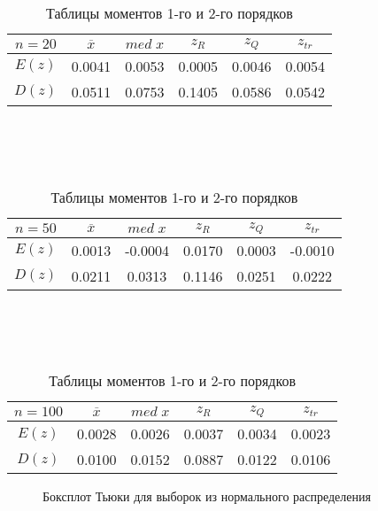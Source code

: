 \documentclass[12pt]{article}
\begin{document}
\begin{table}[h!]
	\begin{tabular}{ | c | c | c | c | c | c |}
	\hline
	$n = 20$ & $\overline{x}$ & $med\;x$ & $z_R$ & $z_Q$ & $z_{tr}$ \\ \hline
	$E(z)$ & 0.0041 & 0.0053 & 0.0005 & 0.0046 & 0.0054 \\ \hline
	$D(z)$ & 0.0511 & 0.0753 & 0.1405 & 0.0586 & 0.0542 \\ \hline
	\end{tabular}
	\\
	\\ \\
	\begin{tabular}{ | c | c | c | c | c | c |}
	\hline
	$n = 50$ & $\overline{x}$ & $med\;x$ & $z_R$ & $z_Q$ & $z_{tr}$ \\ \hline
	$E(z)$ & 0.0013 & -0.0004 & 0.0170 & 0.0003 & -0.0010 \\ \hline
	$D(z)$ & 0.0211 & 0.0313 & 0.1146 & 0.0251 & 0.0222 \\ \hline
	\end{tabular}
	\\ 
	\\ \\
	\begin{tabular}{ | c | c | c | c | c | c |}
	\hline
	$n = 100$ & $\overline{x}$ & $med\;x$ & $z_R$ & $z_Q$ & $z_{tr}$ \\ \hline
	$E(z)$ & 0.0028 & 0.0026 & 0.0037 & 0.0034 & 0.0023 \\ \hline
	$D(z)$ & 0.0100 & 0.0152 & 0.0887 & 0.0122 & 0.0106 \\ \hline
	\end{tabular}
	\caption*{Таблицы моментов 1-го и 2-го порядков}
\end{table}


\begin{center}
\end{center}

\begin{figure}[h!]
	\centering
	\label{1_pic:2}
	\caption{Боксплот Тьюки для выборок из нормального распределения}
\end{figure}
\end{document}
